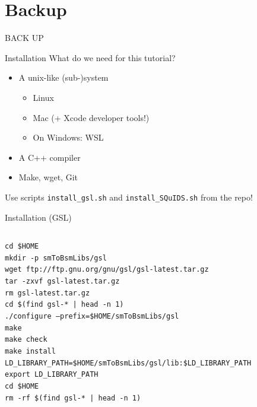 \documentclass[]{beamer}
\newcommand{\backupbegin}{
	\newcounter{finalframe}
	\setcounter{finalframe}{\value{framenumber}}
}
\begin{document}
\appendix

\section{Backup}
\backupbegin

\begin{frame}
    \centering \Huge BACK UP
\end{frame}

\begin{frame}{Installation}
  What do we need for this tutorial?
  \begin{itemize}
    \item A unix-like (sub-)system 
    \begin{itemize}
      \item Linux
      \item Mac (+ Xcode developer tools!)
      \item On Windows: WSL
    \end{itemize}
    \item A C++ compiler
    \item Make, wget, Git
  \end{itemize}
  Use scripts \texttt{install\_gsl.sh} and \texttt{install\_SQuIDS.sh} from the repo!
\end{frame}

\begin{frame}{Installation (GSL)}
  \begin{columns}
    \begin{column}{\textwidth}
      {\tiny
        \begin{tcolorbox}[colback=gray!5!white]
        \texttt{cd \$HOME} \\
        \texttt{mkdir -p smToBsmLibs/gsl} \\
        \texttt{wget ftp://ftp.gnu.org/gnu/gsl/gsl-latest.tar.gz} \\
        \texttt{tar -zxvf gsl-latest.tar.gz} \\
        \texttt{rm gsl-latest.tar.gz} \\
        \texttt{cd \$(find gsl-* | head -n 1)} \\
        \texttt{./configure --prefix=\$HOME/smToBsmLibs/gsl} \\
        \texttt{make} \\
        \texttt{make check} \\
        \texttt{make install} \\
        \texttt{LD\_LIBRARY\_PATH=\$HOME/smToBsmLibs/gsl/lib:\$LD\_LIBRARY\_PATH} \\
        \texttt{export LD\_LIBRARY\_PATH} \\
        \texttt{cd \$HOME} \\
        \texttt{rm -rf \$(find gsl-* | head -n 1)}
      \end{tcolorbox}}
    \end{column}
  \end{columns}
\end{frame}
\end{document}
